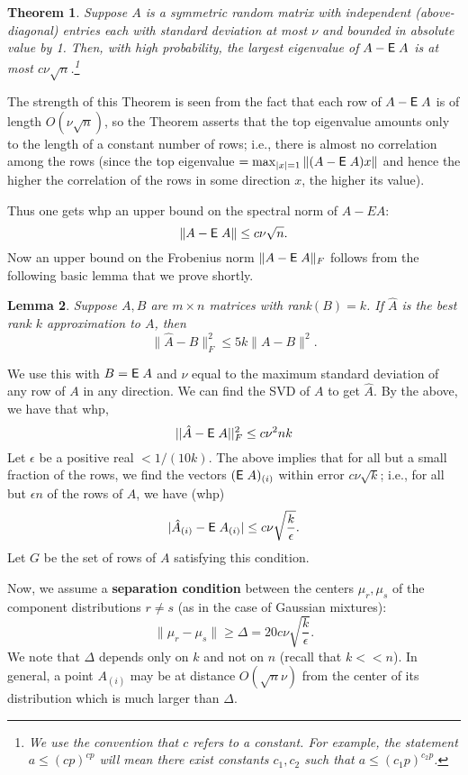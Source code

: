 \documentclass{book}
\newtheorem{theorem}{Theorem}[chapter]
\newtheorem{lemma}[theorem]{Lemma}
\numberwithin{exercise}{chapter}
\newtheorem{remark}[theorem]{Remark}
\begin{document}
\begin{theorem}\label{wigner}
Suppose $A$ is a symmetric random matrix with independent
(above-diagonal) entries each with standard deviation at most
$\nu$ and bounded in absolute value by 1. Then, with high
probability, the largest eigenvalue of $A-\hbox{{\sf E}\;} A$ is at most $c\nu
\sqrt n$.\footnote{ We use the convention that $c$ refers to a
constant. For example, the statement $a\leq (cp)^{cp}$ will mean
there exist constants $c_1,c_2$ such that $a\leq (c_1p)^{c_2p}$.}
\end{theorem}

The strength of this Theorem is seen from the fact that each row of $A-\hbox{{\sf E}\;} A$
is of length $O(\nu\sqrt n)$, so the Theorem asserts that the top eigenvalue amounts only
to the length of a constant number of rows; i.e., there is almost no correlation among
the rows (since the top eigenvalue $=\max_{|x|=1}\|(A-\hbox{{\sf E}\;} A)x\|$ and hence the higher
the correlation of the rows in some direction $x$, the higher its value).

Thus one gets whp an upper bound on the spectral norm of $A-EA$:
$$\|A-\hbox{{\sf E}\;} A\|\leq c\nu\sqrt n.$$
Now an upper bound on the Frobenius norm $\|A-\hbox{{\sf E}\;} A\|_F$ follows from the following basic lemma that we prove shortly.

\begin{lemma}\label{AMtoF}
Suppose $A,B$ are $m\times n$ matrices with rank$(B)=k$. If $\hat A$ is the best rank $k$
approximation to $A$, then
$$\|\hat A-B\|_F^2\leq 5k\|A-B\|^2.$$
\end{lemma}

We use this with $B=\hbox{{\sf E}\;} A$ and $\nu$ equal to the maximum standard deviation of any
row of $A$ in any direction. We can find the SVD of $A$ to get $\hat A$. By the above, we have that
whp,
$$||\hat A-\hbox{{\sf E}\;} A||_F^2\leq c\nu^2nk$$
Let $\epsilon$ be a positive real $<1/(10k)$. The above implies that for all but a small fraction of the rows,
we find the vectors $(\hbox{{\sf E}\;} A)_{(i)}$ within error $c\nu\sqrt k$; i.e.,
for all but $\epsilon n$ of the rows of $A$,
we have (whp)
$$|\hat A_{(i)}-\hbox{{\sf E}\;} A_{(i)}|\leq c\nu\sqrt{\frac{k}{\epsilon}}.$$
Let $G$ be the set of rows of $A$ satisfying this condition.

Now, we assume a {\bf separation condition} between the centers $\mu_r,\mu_s$ of the component distributions $r\not= s$
(as in the case of Gaussian mixtures):
$$\|\mu_r-\mu_s\|\geq \Delta = 20 c\nu\sqrt{\frac{k}{\epsilon}}.$$
We note that $\Delta$ depends only on $k$ and not on $n$ (recall
that $k<<n$). In general, a point $A_{(i)}$ may be at distance $O(\sqrt n\nu)$ from the center of its distribution which is much larger than $\Delta$.
\end{document}
